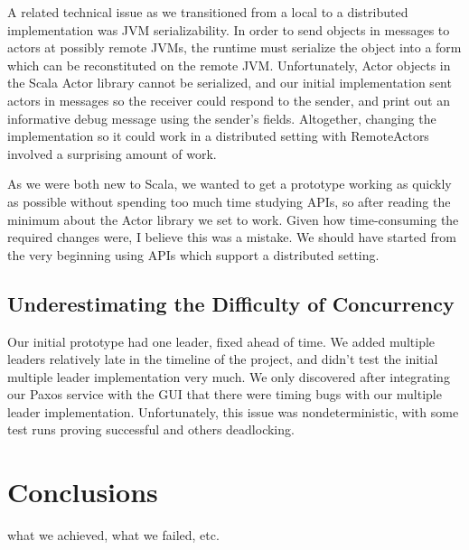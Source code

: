 \documentclass{sig-alternate}
\begin{document}
A related technical issue as we transitioned from a local to a distributed implementation was JVM serializability. In order to send objects in messages to actors at possibly remote JVMs, the runtime must serialize the object into a form which can be reconstituted on the remote JVM. Unfortunately, Actor objects in the Scala Actor library cannot be serialized, and our initial implementation sent actors in messages so the receiver could respond to the sender, and print out an informative debug message using the sender's fields. Altogether, changing the implementation so it could work in a distributed setting with RemoteActors involved a surprising amount of work. 

As we were both new to Scala, we wanted to get a prototype working as quickly as possible without spending too much time studying APIs, so after reading the minimum about the Actor library we set to work. Given how time-consuming the required changes were, I believe this was a mistake. We should have started from the very beginning using APIs which support a distributed setting.

\subsection{Underestimating the Difficulty of Concurrency}
Our initial prototype had one leader, fixed ahead of time. We added multiple leaders relatively late in the timeline of the project, and didn't test the initial multiple leader implementation very much. We only discovered after integrating our Paxos service with the GUI that there were timing bugs with our multiple leader implementation. Unfortunately, this issue was nondeterministic, with some test runs proving successful and others deadlocking. 



\section{Conclusions}
what we achieved, what we failed, etc.



%
%
\end{document}
